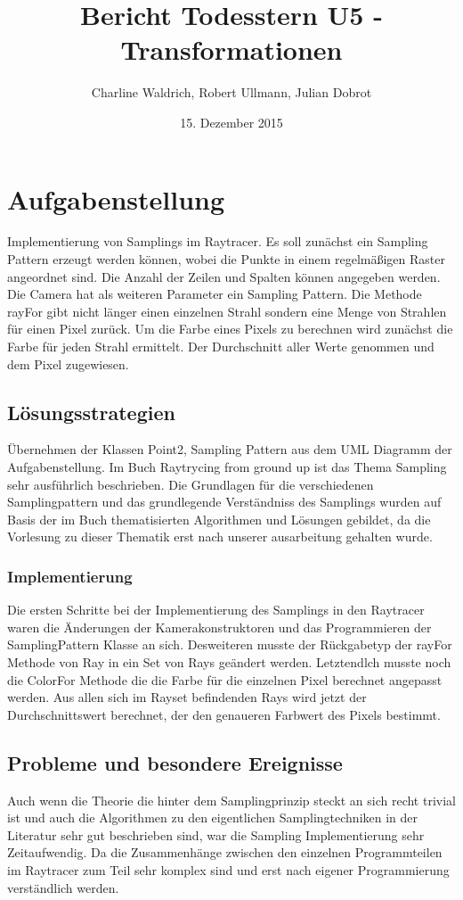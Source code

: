 \documentclass[14pt]{extarticle}
\title{Bericht Todesstern U5 - Transformationen}
\author{Charline Waldrich, Robert Ullmann, Julian Dobrot}
\date{15. Dezember 2015}
\begin{document}
\maketitle
\pagebreak
\tableofcontents

\section{Aufgabenstellung}
Implementierung von Samplings im Raytracer. Es soll zunächst ein Sampling Pattern erzeugt werden können, wobei die Punkte in einem regelmäßigen Raster angeordnet sind. Die Anzahl der Zeilen und Spalten können angegeben werden. Die Camera hat als weiteren Parameter ein Sampling Pattern. Die Methode rayFor gibt nicht länger einen einzelnen Strahl sondern eine Menge von Strahlen für einen Pixel zurück. Um die Farbe eines Pixels zu berechnen wird zunächst die Farbe für jeden Strahl ermittelt. Der Durchschnitt aller Werte genommen und dem Pixel zugewiesen. 
\subsection{Lösungsstrategien}
Übernehmen der Klassen Point2, Sampling Pattern aus dem UML Diagramm der Aufgabenstellung. Im Buch Raytrycing from ground up ist das Thema Sampling sehr ausführlich beschrieben. Die Grundlagen für die verschiedenen Samplingpattern und das grundlegende Verständniss des Samplings wurden auf Basis der im Buch thematisierten Algorithmen und Lösungen gebildet, da die Vorlesung zu dieser Thematik erst nach unserer ausarbeitung gehalten wurde.
\subsubsection{Implementierung}
Die ersten Schritte bei der Implementierung des Samplings in den Raytracer waren die Änderungen der Kamerakonstruktoren und das Programmieren der SamplingPattern Klasse an sich. Desweiteren musste der Rückgabetyp der rayFor Methode von Ray in ein Set von Rays geändert werden. Letztendlch musste noch  die ColorFor Methode die die Farbe für die einzelnen Pixel berechnet angepasst werden. Aus allen sich im Rayset befindenden Rays wird jetzt der Durchschnittswert berechnet, der den genaueren Farbwert des Pixels bestimmt.
\subsection{Probleme und besondere Ereignisse}
Auch wenn die Theorie die hinter dem Samplingprinzip steckt an sich recht trivial ist und auch die Algorithmen zu den eigentlichen Samplingtechniken in der Literatur sehr gut beschrieben sind, war die Sampling Implementierung sehr Zeitaufwendig. Da die Zusammenhänge zwischen den einzelnen Programmteilen im Raytracer zum Teil sehr komplex sind und erst nach eigener Programmierung verständlich werden. 
\end{document}

